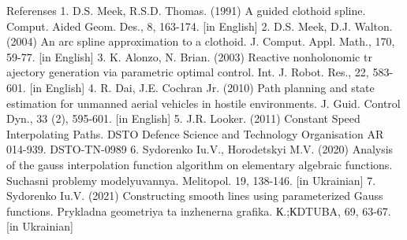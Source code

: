 \documentclass[12pt,a4paper]{article}
\begin{document}
Referenses 1. D.S. Meek, R.S.D. Thomas. (1991) A guided clothoid spline. Comput. Aided Geom. Des., 8, 163-174. [in English] 2. D.S. Meek, D.J. Walton. (2004) An arc spline approximation to a clothoid. J. Comput. Appl. Math., 170, 59-77. [in English] 3. K. Alonzo, N. Brian. (2003) Reactive nonholonomic tr ajectory generation via parametric optimal control. Int. J. Robot. Res., 22, 583-601. [in English] 4. R. Dai, J.E. Cochran Jr. (2010) Path planning and state estimation for unmanned aerial vehicles in hostile environments. J. Guid. Control Dyn., 33 (2), 595-601. [in English] 5. J.R. Looker. (2011) Constant Speed Interpolating Paths. DSTO Defence Science and Technology Organisation AR 014-939. DSTO-TN-0989 6. Sydorenko Iu.V., Horodetskyi M.V. (2020) Analysis of the gauss interpolation function algorithm on elementary algebraic functions. Suchasni problemy modelyuvannya. Melitopol. 19, 138-146. [in Ukrainian] 7. Sydorenko Iu.V. (2021) Constructing smooth lines using parameterized Gauss functions. Prykladna geometriya ta inzhenerna grafika. К.;КDTUBA, 69, 63-67. [in Ukrainian]
\par
\end{document}
